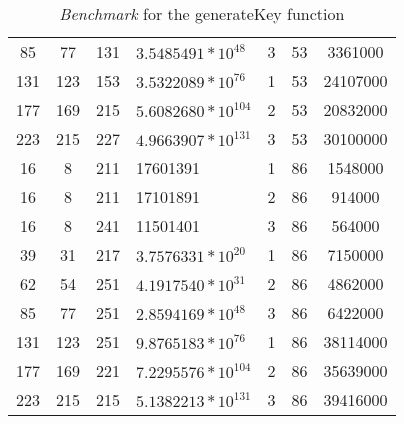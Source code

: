 \documentclass[a4paper,11pt]{article}
\begin{document}
\begin{table}
\begin{tabular}{ |c|c|c|p{3cm}|c|c|c| }
      85 & 77 & 131 & \begin{math} 3.5485491 \ast 10^{48} \end{math} & 3 & 53 & 3361000 \\
      131 & 123 & 153 & \begin{math} 3.5322089 \ast 10^{76} \end{math} & 1 & 53 & 24107000 \\
      177 & 169 & 215 & \begin{math} 5.6082680 \ast 10^{104} \end{math} & 2 & 53 & 20832000 \\
      223 & 215 & 227 & \begin{math} 4.9663907 \ast 10^{131} \end{math} & 3 & 53 & 30100000 \\
      16 & 8 & 211 & 17601391 & 1 & 86 & 1548000 \\
      16 & 8 & 211 & 17101891 & 2 & 86 & 914000 \\
      16 & 8 & 241 & 11501401 & 3 & 86 & 564000 \\
      39 & 31 & 217 & \begin{math} 3.7576331 \ast 10^{20} \end{math} & 1 & 86 & 7150000 \\
      62 & 54 & 251 & \begin{math} 4.1917540 \ast 10^{31} \end{math} & 2 & 86 & 4862000 \\
      85 & 77 & 251 & \begin{math} 2.8594169 \ast 10^{48} \end{math} & 3 & 86 & 6422000 \\
      131 & 123 & 251 & \begin{math} 9.8765183 \ast 10^{76} \end{math} & 1 & 86 & 38114000 \\
      177 & 169 & 221 & \begin{math} 7.2295576 \ast 10^{104} \end{math} & 2 & 86 & 35639000 \\
      223 & 215 & 215 & \begin{math} 5.1382213 \ast 10^{131} \end{math} & 3 & 86 & 39416000 \\

      \hline
    \end{tabular}
    \caption{\emph{Benchmark} for the generateKey function}
    \label{tab:res:generateKey}
\end{table}
\end{document}
